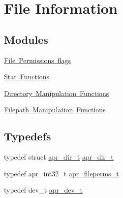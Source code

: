 \hypertarget{group__apr__file__info}{}\section{File Information}
\label{group__apr__file__info}
\subsection*{Modules}
\begin{DoxyCompactItemize}
\item 
\mbox{\hyperlink{group__apr__file__permissions}{File Permissions flags}}
\item 
\mbox{\hyperlink{group__apr__file__stat}{Stat Functions}}
\item 
\mbox{\hyperlink{group__apr__dir}{Directory Manipulation Functions}}
\item 
\mbox{\hyperlink{group__apr__filepath}{Filepath Manipulation Functions}}
\end{DoxyCompactItemize}
\subsection*{Typedefs}
\begin{DoxyCompactItemize}
\item 
typedef struct \mbox{\hyperlink{structapr__dir__t}{apr\+\_\+dir\+\_\+t}} \mbox{\hyperlink{group__apr__file__info_ga92ed8cf52cba2abb42cf74087aa74da8}{apr\+\_\+dir\+\_\+t}}
\item 
typedef apr\+\_\+int32\+\_\+t \mbox{\hyperlink{group__apr__file__info_ga3af19c4c47007169064a70f9351bc7d8}{apr\+\_\+fileperms\+\_\+t}}
\item 
typedef dev\+\_\+t \mbox{\hyperlink{group__apr__file__info_gae2c25c4b679613081599f776efa96c4a}{apr\+\_\+dev\+\_\+t}}
\end{DoxyCompactItemize}
